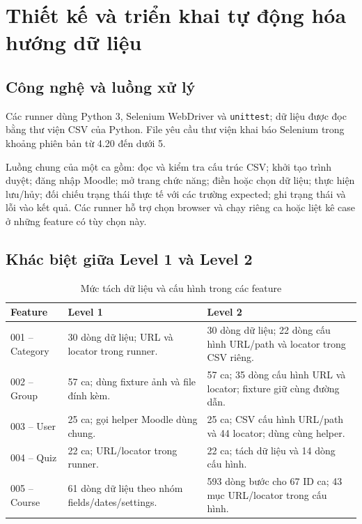 \section{Thiết kế và triển khai tự động hóa hướng dữ liệu}
\label{sec:automation}

\subsection{Công nghệ và luồng xử lý}
Các runner dùng Python 3, Selenium WebDriver và \texttt{unittest}; dữ liệu được đọc bằng thư viện CSV của Python. File yêu cầu thư viện khai báo Selenium trong khoảng phiên bản từ 4.20 đến dưới 5.\cite{prj3source}

Luồng chung của một ca gồm: đọc và kiểm tra cấu trúc CSV; khởi tạo trình duyệt; đăng nhập Moodle; mở trang chức năng; điền hoặc chọn dữ liệu; thực hiện lưu/hủy; đối chiếu trạng thái thực tế với các trường expected; ghi trạng thái và lỗi vào kết quả. Các runner hỗ trợ chọn browser và chạy riêng ca hoặc liệt kê case ở những feature có tùy chọn này.

\subsection{Khác biệt giữa Level 1 và Level 2}
\begin{table}[H]
\centering
\caption{Mức tách dữ liệu và cấu hình trong các feature}
\label{tab:level-config}
\small
\begin{tabular}{|p{2.4cm}|p{5.1cm}|p{5.1cm}|}
\hline
\textbf{Feature} & \textbf{Level 1} & \textbf{Level 2} \\
\hline
001 -- Category & 30 dòng dữ liệu; URL và locator trong runner. & 30 dòng dữ liệu; 22 dòng cấu hình URL/path và locator trong CSV riêng. \\
\hline
002 -- Group & 57 ca; dùng fixture ảnh và file đính kèm. & 57 ca; 35 dòng cấu hình URL và locator; fixture giữ cùng đường dẫn. \\
\hline
003 -- User & 25 ca; gọi helper Moodle dùng chung. & 25 ca; CSV cấu hình URL/path và 44 locator; dùng cùng helper. \\
\hline
004 -- Quiz & 22 ca; URL/locator trong runner. & 22 ca; tách dữ liệu và 14 dòng cấu hình. \\
\hline
005 -- Course & 61 dòng dữ liệu theo nhóm fields/dates/settings. & 593 dòng bước cho 67 ID ca; 43 mục URL/locator trong cấu hình. \\
\hline
\end{tabular}
\end{table}

